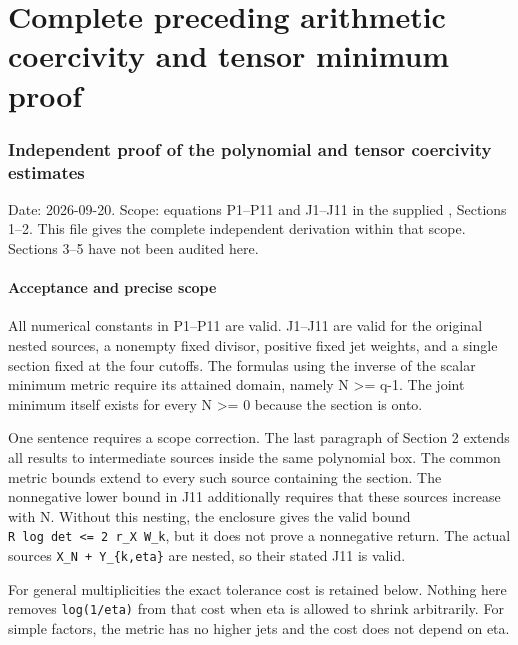 \endgroup

\clearpage\begingroup
\part*{Complete preceding arithmetic coercivity and tensor minimum proof}
\providecommand{\mrcoerctightlist}{\setlength{\itemsep}{0pt}\setlength{\parskip}{0pt}}

\section{Independent proof of the polynomial and tensor coercivity estimates}\label{mrcoerc:independent-proof-of-the-polynomial-and-tensor-coercivity-estimates}

Date: 2026-09-20. Scope: equations P1--P11 and J1--J11 in the supplied , Sections 1--2. This file gives the complete independent derivation within that scope. Sections 3--5 have not been audited here.

\subsection{Acceptance and precise scope}\label{mrcoerc:acceptance-and-precise-scope}

All numerical constants in P1--P11 are valid. J1--J11 are valid for the original nested sources, a nonempty fixed divisor, positive fixed jet weights, and a single section fixed at the four cutoffs. The formulas using the inverse of the scalar minimum metric require its attained domain, namely N \textgreater= q-1. The joint minimum itself exists for every N \textgreater= 0 because the section is onto.

One sentence requires a scope correction. The last paragraph of Section 2 extends all results to intermediate sources inside the same polynomial box. The common metric bounds extend to every such source containing the section. The nonnegative lower bound in J11 additionally requires that these sources increase with N. Without this nesting, the enclosure gives the valid bound \texttt{\textbar{}R\ log\ det\textbar{}\ \textless{}=\ 2\ r\_X\ W\_k}, but it does not prove a nonnegative return. The actual sources \texttt{X\_N\ +\ Y\_\{k,eta\}} are nested, so their stated J11 is valid.

For general multiplicities the exact tolerance cost is retained below. Nothing here removes \texttt{log(1/eta)} from that cost when eta is allowed to shrink arbitrarily. For simple factors, the metric has no higher jets and the cost does not depend on eta.

